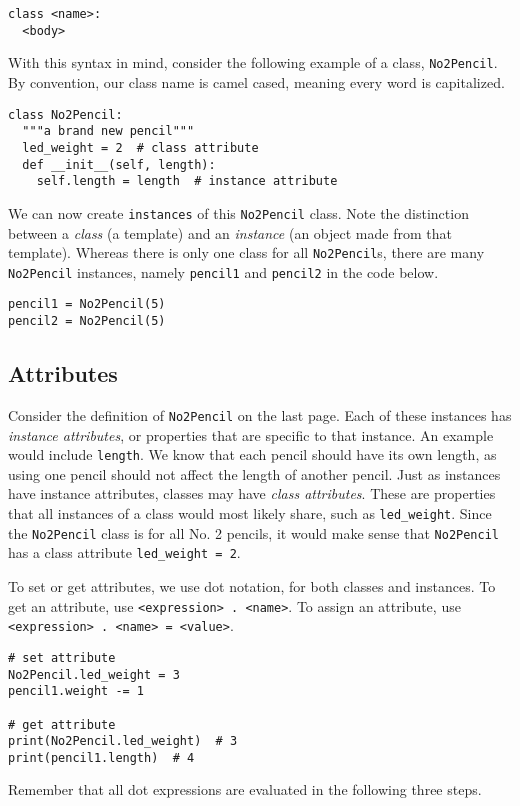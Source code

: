 \documentclass[a4paper]{book}
\begin{document}
\begin{lstlisting}
class <name>:
  <body>
\end{lstlisting}

With this syntax in mind, consider the following example of a class, {\tt No2Pencil}. By convention, our class name is camel cased, meaning every word is capitalized.

\begin{lstlisting}
class No2Pencil:
  """a brand new pencil"""
  led_weight = 2  # class attribute
  def __init__(self, length):
    self.length = length  # instance attribute
\end{lstlisting}

We can now create {\tt instances} of this {\tt No2Pencil} class. Note the distinction between a \textit{class} (a template) and an \textit{instance} (an object made from that template). Whereas there is only one class for all {\tt No2Pencil}s, there are many {\tt No2Pencil} instances, namely {\tt pencil1} and {\tt pencil2} in the code below. 

\begin{lstlisting}
pencil1 = No2Pencil(5)
pencil2 = No2Pencil(5)
\end{lstlisting}

\subsection{Attributes}

Consider the definition of {\tt No2Pencil} on the last page. Each of these instances has \textit{instance attributes}, or properties that are specific to that instance. An example would include {\tt length}. We know that each pencil should have its own length, as using one pencil should not affect the length of another pencil. Just as instances have instance attributes, classes may have \textit{class attributes}. These are properties that all instances of a class would most likely share, such as {\tt led\_weight}. Since the {\tt No2Pencil} class is for all No. 2 pencils, it would make sense that {\tt No2Pencil} has a class attribute {\tt led\_weight = 2}.

To set or get attributes, we use dot notation, for both classes and instances. To get an attribute, use {\tt <expression> . <name>}. To assign an attribute, use {\tt <expression> . <name> = <value>}.

\begin{lstlisting}
# set attribute
No2Pencil.led_weight = 3
pencil1.weight -= 1

# get attribute
print(No2Pencil.led_weight)  # 3
print(pencil1.length)  # 4
\end{lstlisting}
Remember that all dot expressions are evaluated in the following three steps.
\end{document}
